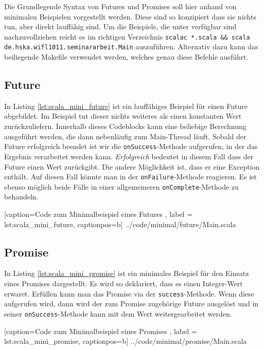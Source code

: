 \documentclass[11pt,a4paper,titlepage,ngerman]{scrartcl}
\begin{document}
Die Grundlegende Syntax von Futures und Promises soll hier anhand von minimalen
Beispielen vorgestellt werden. Diese sind so konzipiert dass sie nichts
tun, aber direkt lauffähig sind. Um die Beispiele, die unter \cite{code}
verfügbar sind nachzuvollziehen reicht es im richtigen Verzeichnis 
\texttt{scalac *.scala \&\& scala de.hska.wifl1011.seminararbeit.Main} auszuführen.
Alternativ dazu kann das beiliegende Makefile verwendet werden, welches genau
diese Befehle ausführt.

\subsection{Future}

In Listing \ref{lst:scala_mini_future} ist ein lauffähiges Beispiel für einen 
Future abgebildet. Im Beispiel tut dieser nichts weiteres als einen konstanten
Wert zurückzuliefern. Innerhalb dieses Codeblocks kann eine beliebige Berechnung
ausgeführt werden, die dann nebenläufig zum Main-Thread läuft. Sobald der Future
erfolgreich beendet ist wir die \texttt{onSuccess}-Methode aufgerufen, in der
das Ergebnis verarbeitet werden kann. \emph{Erfolgreich} bedeutet in diesem
Fall dass der Future einen Wert zurückgibt. Die andere Möglichkeit ist, dass
er eine Exception enthält. Auf diesen Fall könnte man in der \texttt{onFailure}-Methode
reagieren. Es ist ebenso möglich beide Fälle in einer allgemeineren
\texttt{onComplete}-Methode zu behandeln.


    [caption={Code zum Minimalbeispiel eines Futures },
       label = lst:scala_mini_future,
       captionpos=b]
 {../code/minimal/future/Main.scala}

\subsection{Promise}

In Listing \ref{lst:scala_mini_promise} ist ein minimales Beispiel für den
Einsatz eines Promises dargestellt. Es wird so deklariert, dass es einen
Integer-Wert erwaret. Erfüllen kann man das Promise via der \texttt{success}-Methode.
Wenn diese aufgerufen wird, dann wird der zum Promise zugehörige Future ausgelöst
und in seiner \texttt{onSuccess}-Methode kann mit dem Wert weitergearbeitet werden.


    [caption={Code zum Minimalbeispiel eines Promises },
       label = lst:scala_mini_promise,
       captionpos=b]
 {../code/minimal/promise/Main.scala}
\end{document}
